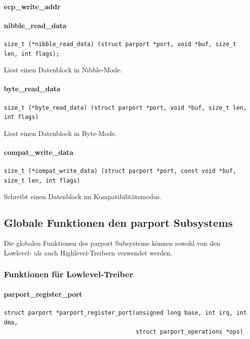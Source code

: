 \documentclass[a4paper,11pt]{article}
\begin{document}
\paragraph{ecp\_write\_addr}

\paragraph{nibble\_read\_data}

\begin{verbatim}
size_t (*nibble_read_data) (struct parport *port, void *buf, size_t len, int flags);
\end{verbatim}

Liest einen Datenblock in Nibble-Mode.

\paragraph{byte\_read\_data}

\begin{verbatim}
size_t (*byte_read_data) (struct parport *port, void *buf, size_t len, int flags)
\end{verbatim}

Liest einen Datenblock in Byte-Mode.

\paragraph{compat\_write\_data}

\begin{verbatim}
size_t (*compat_write_data) (struct parport *port, const void *buf, size_t len, int flags)
\end{verbatim}

Schreibt einen Datenblock im Kompatibilitätsmodus.

\subsection{Globale Funktionen den parport Subsystems}

Die globalen Funktionen des parport Subsystems können sowohl von den Lowlevel- als auch
Highlevel-Treibern verwendet werden.

\subsubsection{Funktionen für Lowlevel-Treiber}

\paragraph{parport\_register\_port}
\begin{verbatim}
struct parport *parport_register_port(unsigned long base, int irq, int dma, 
                                      struct parport_operations *ops)
\end{verbatim}
\end{document}
